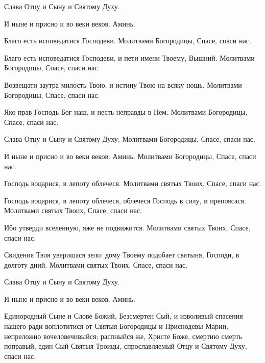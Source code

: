 \begin{mymulticols}
 Слава Отцу и Сыну и Святому Духу. 

 И ныне и присно и во веки веков. Аминь. 



 Благо есть исповедатися Господеви. Молитвами Богородицы, Спасе, спаси нас. 

 Благо есть исповедатися Господеви, и пети имени Твоему, Вышний. Молитвами Богородицы, Спасе, спаси нас. 

 Возвещати заутра милость Твою, и истину Твою на всяку нощь. Молитвами Богородицы, Спасе, спаси нас. 

 Яко прав Господь Бог наш, и несть неправды в Нем. Молитвами Богородицы, Спасе, спаси нас.

 Слава Отцу и Сыну и Святому Духу: Молитвами Богородицы, Спасе, спаси нас.

 И ныне и присно и во веки веков. Аминь. Молитвами Богородицы, Спасе, спаси нас.


 Господь воцарися, в лепоту облечеся. Молитвами святых Твоих, Спасе, спаси нас. 

 Господь воцарися, в лепоту облечеся, облечеся Господь в силу, и препоясася. Молитвами святых Твоих, Спасе, спаси нас.

 Ибо утверди вселенную, яже не подвижится. Молитвами святых Твоих, Спасе, спаси нас.

 Свидения Твоя уверишася зело: дому Твоему подобает святыня, Господи, в долготу дний. Молитвами святых Твоих, Спасе, спаси нас.

 Слава Отцу и Сыну и Святому Духу. 

 И ныне и присно и во веки веков. Аминь. 


 Единородный Сыне и Слове Божий, Безсмертен Сый, и изволивый спасения нашего ради воплотитися от Святыя Богородицы и Приснодевы Марии, непреложно вочеловечивыйся; распныйся же, Христе Боже, смертию смерть поправый, един Сый Святыя Троицы, спрославляемый Отцу и Святому Духу, спаси нас. 



\end{mymulticols}
